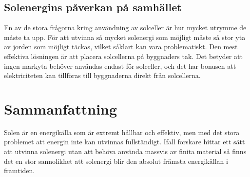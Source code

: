 \documentclass[11p]{article}
\begin{document}
    \subsection{Solenergins påverkan på samhället}
    En av de stora frågorna kring användning av solceller är hur mycket utrymme de måste ta upp.
    För att utvinna så mycket solenergi som möjligt måste så stor yta av jorden som möjligt täckas, vilket såklart kan vara problematiskt.
    \newline Den mest effektiva lösningen är att placera solcellerna på byggnaders tak.
    Det betyder att ingen markyta behöver användas endast för solceller, och det har bonusen att elektriciteten kan tillföras till byggnaderna direkt från solcellerna. \parencite{Naturskyddsforeningen}

    \section{Sammanfattning}
    Solen är en energikälla som är extremt hållbar och effektiv, men med det stora problemet att energin inte kan utvinnas fullständigt.
    Ifall forskare hittar ett sätt att utvinna solenergi utan att behöva använda massvis av finita material så finns det en stor sannolikhet att solenergi blir den absolut främsta energikällan i framtiden.

    \printbibliography
\end{document}
